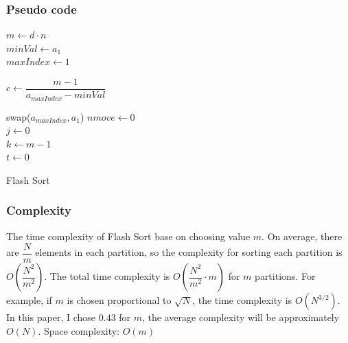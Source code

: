 \documentclass[11pt,a4paper]{article}
\begin{document}
\subsubsection*{Pseudo code}
\begin{algorithm2e}
  \SetAlgoLined
  $m \gets d \cdot n$\\

  $minVal \gets a_1$\\
  $maxIndex \gets 1$\\
  
  $c \gets \dfrac{m-1}{a_{maxIndex} - minVal}$\\
  
  swap($a_{maxIndex}, a_1$)
  $nmove \gets 0$\\
  $j \gets 0$\\
  $k \gets m-1$\\
  $t \gets 0$\\
  
  
  \caption{Flash Sort}
\end{algorithm2e}

\newpage
\subsubsection*{Complexity}
The time complexity of Flash Sort base on choosing value $m$.
On average, there are $\dfrac{N}{m}$ elements in each partition, so the complexity for sorting each partition is $O(\dfrac{N^2}{m^2})$.
The total time complexity is $O(\dfrac{N^2}{m^2}\cdot m)$ for $m$ partitions.
For example, if $m$ is chosen proportional to $\sqrt N$, the time complexity is $O(N^{3/2})$.
In this paper, I chose $0.43$ for $m$, the average complexity will be approximately $O(N)$.
\newline
\newline
Space complexity: $O(m)$
\end{document}

